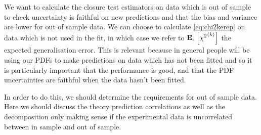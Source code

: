 We want to calculate the closure test estimators on data which is out of sample
to check uncertainty is faithful on new predictions and that the bias and variance
are lower for out of sample data. We can choose to calculate \eqref{eq:chi2kerep}
on data which is not used in the fit, in which case we refer to $\mathbf{E}_{\epsilon}\left[ {\chi^2}^{(k)} \right]$
the expected generalisation error. This is relevant because in general people
will be using our PDFs to make predictions on data which has not been fitted
and so it is particularly important that the performance is good, and that the
PDF uncertainties are faithful when the data hasn't been fitted.

In order to do this, we should determine the requirements for out of sample data.
Here we should discuss the theory prediction correlations as well as the
decomposition only making sense if the experimental data is uncorrelated between
in sample and out of sample.
